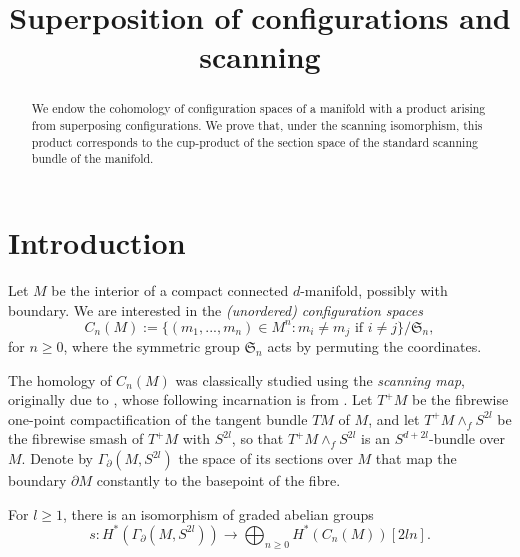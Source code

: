 
\title{Superposition of configurations and scanning}
\maketitle
\begin{abstract}
We endow the cohomology of configuration spaces of a manifold with a product arising from superposing configurations. We prove that, under the scanning isomorphism, this product corresponds to the cup-product of the section space of the standard scanning bundle of the manifold.
\end{abstract}

\section*{Introduction}
Let $M$ be the interior of a  compact connected $d$-manifold, possibly with boundary. We are interested in the \textit{(unordered) configuration spaces} 
$$C_n(M):=\{(m_1,...,m_n)\in {M}^n:m_i\neq m_j \text{ if } i\neq j\}/\mathfrak{S}_n,$$
for $n\ge 0$,
where the symmetric group $\mathfrak{S}_n$ acts by permuting the coordinates.

The homology of $C_n(M)$ was classically studied using the \textit{scanning map}, originally due to \cite{McDuff1975,Segal73}, whose following incarnation is from \cite{bodigheimer88rationalcohomologyofsurfaces,BODIGHEIMER1989111generalconfigurations}. 
Let $T^+M$ be the fibrewise one-point compactification of the tangent bundle $TM$ of $M$, and let $T^+M\wedge_fS^{2l}$ be the fibrewise smash of $T^+M$ with $S^{2l}$, so that $T^+M\wedge_fS^{2l}$ is an $S^{d+2l}$-bundle over $M$. 
Denote by $\Gamma_{\partial}(M,S^{2l})$ the space of its sections over $M$ that map the boundary $\partial M$ constantly to the basepoint of the fibre.
\begin{athm}\label{thm:A}
For $l\ge 1$, there is an isomorphism of graded abelian groups
\begin{equation*}\label{eq:introscanningisomorphism}
s:{H}^*\left(\Gamma_{\partial}(M,S^{2l})\right)\longrightarrow \bigoplus_{n\ge 0}H^*(C_n(M))[2ln].
\end{equation*}
\end{athm}

